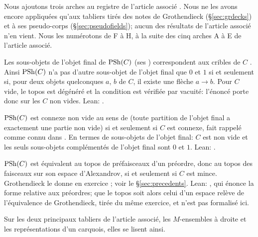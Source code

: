 Nous ajoutons trois arches au registre de l'article associé \cite{bridges-generator}. Nous ne les avons encore appliquées qu'aux tabliers tirés des notes de Grothendieck (\S\ref{sec:grdecks}) et à ses pseudo-corps (\S\ref{sec:pseudofields}); aucun des résultats de l'article associé n'en vient. Nous les numérotons de F à H, à la suite des cinq arches A à E de l'article associé.
\setcounter{bridge}{5}

\begin{bridge}\label{br:twoval}
Les sous-objets de l'objet final de $\mathrm{PSh}(C)$ (ses ) correspondent aux cribles de $C$ \cite[IV~8.4.4]{sga4}. Ainsi $\mathrm{PSh}(C)$ n'a pas d'autre sous-objet de l'objet final que $0$ et $1$ si et seulement si, pour deux objets quelconques $a$, $b$ de $C$, il existe une flèche $a\to b$. Pour $C$ vide, le topos est dégénéré et la condition est vérifiée par vacuité: l'énoncé porte donc sur les $C$ non vides. Lean: .
\end{bridge}

\begin{bridge}[Connexe]\label{br:conn}
$\mathrm{PSh}(C)$ est connexe non vide au sens de \cite[IV~8.7~e)]{sga4} (toute partition de l'objet final a exactement une partie non vide) si et seulement si $C$ est connexe, fait rappelé comme connu dans \cite[ex.~3.6]{hora-kamio}. En termes de sous-objets de l'objet final: $C$ est non vide et les seuls sous-objets complémentés de l'objet final sont $0$ et $1$. Lean: .
\end{bridge}

\begin{bridge}[Spatial]\label{br:spatial}
$\mathrm{PSh}(C)$ est équivalent au topos de préfaisceaux d'un préordre, donc au topos des faisceaux sur son espace d'Alexandrov, si et seulement si $C$ est mince. Grothendieck le donne en exercice \cite[p.~26]{grothendieck-161-3}; voir le \S\ref{sec:precedents}. Lean: , qui énonce la forme relative aux préordres; que le topos soit alors celui d'un espace relève de l'équivalence de Grothendieck, tirée du même exercice, et n'est pas formalisé ici.
\end{bridge}

Sur les deux principaux tabliers de l'article associé, les $M$-ensembles à droite et les représentations d'un carquois, elles se lisent ainsi.

